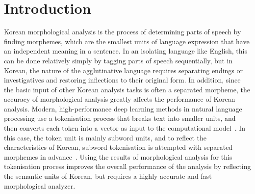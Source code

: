 \documentclass[AMS,STIX2COL]{WileyNJD-v2}
\begin{document}





    \maketitle



    \section{Introduction}\label{sec1}

    Korean morphological analysis is the process of determining parts of speech by finding morphemes, which are the smallest units of language expression that have an independent meaning in a sentence.
    In an isolating language like English, this can be done relatively simply by tagging parts of speech sequentially, but in Korean, the nature of the agglutinative language requires separating endings or investigatives and restoring inflections to their original form.
    In addition, since the basic input of other Korean analysis tasks is often a separated morpheme, the accuracy of morphological analysis greatly affects the performance of Korean analysis.
    Modern, high-performance deep learning methods in natural language processing use a tokenisation process that breaks text into smaller units, and then converts each token into a vector as input to the computational model~\cite{Mikolov2013}.
    In this case, the token unit is mainly subword units, and to reflect the characteristics of Korean, subword tokenisation is attempted with separated morphemes in advance~\cite{Song2021}.
    Using the results of morphological analysis for this tokenisation process improves the overall performance of the analysis by reflecting the semantic units of Korean, but requires a highly accurate and fast morphological analyzer.
\end{document}

